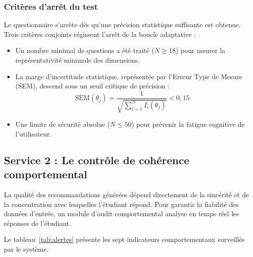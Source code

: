 \subsubsection{Critères d'arrêt du test}

Le questionnaire s'arrête dès qu'une précision statistique suffisante est obtenue. Trois critères conjoints régissent l'arrêt de la boucle adaptative :
\begin{itemize}
    \item Un nombre minimal de questions a été traité ($N \ge 18$) pour assurer la représentativité minimale des dimensions.
    \item La marge d'incertitude statistique, représentée par l'Erreur Type de Mesure (SEM), descend sous un seuil critique de précision :
    \begin{equation}
    \text{SEM}(\theta_j) = \frac{1}{\sqrt{\sum_{i=1}^{N} I_i(\theta_j)}} < 0{,}15
    \label{eq:sem}
    \end{equation}
    \item Une limite de sécurité absolue ($N \le 50$) pour prévenir la fatigue cognitive de l'utilisateur.
\end{itemize}

\subsection{Service 2 : Le contrôle de cohérence comportemental}

La qualité des recommandations générées dépend directement de la sincérité et de la concentration avec lesquelles l'étudiant répond. Pour garantir la fiabilité des données d'entrée, un module d'audit comportemental analyse en temps réel les réponses de l'étudiant.

Le tableau~\ref{tab:alertes} présente les sept indicateurs comportementaux surveillés par le système.

